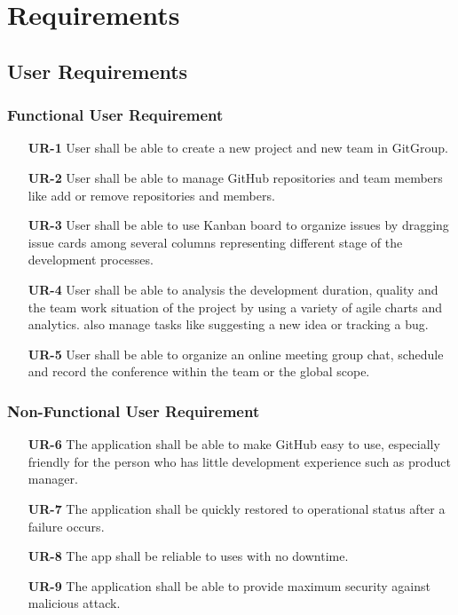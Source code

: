 \documentclass[12pt,a4paper]{report}
\begin{document}
\chapter{Requirements}
\section{User Requirements}
	\subsection{Functional User Requirement}
		\begin{enumerate}
			\item[\textbf{UR-1}] User shall be able to create a new project and new team in GitGroup.
			\item[\textbf{UR-2}] User shall be able to manage GitHub repositories and team members like add or remove repositories and members.
			\item[\textbf{UR-3}] User shall be able to use Kanban board to organize issues by dragging issue cards among several columns representing different stage of the development processes.
			\item[\textbf{UR-4}] User shall be able to analysis the development duration, quality and the team work situation of the project by using a variety of agile charts and analytics.
			also manage tasks like suggesting a new idea or tracking a bug. 
			\item[\textbf{UR-5}] User shall be able to organize an online meeting group chat, schedule and record the conference within the team or the global scope.
		\end{enumerate}
	\subsection{Non-Functional User Requirement}
		\begin{enumerate}
			\item[\textbf{UR-6}] The application shall be able to make GitHub easy to use, especially friendly for the person who has little development experience such as product manager.
			\item[\textbf{UR-7}] The application shall be quickly restored to operational status after a failure occurs.
			\item[\textbf{UR-8}] The app shall be reliable to uses with no downtime.
			\item[\textbf{UR-9}] The application shall be able to provide maximum security against malicious attack.
		\end{enumerate}
\end{document}
